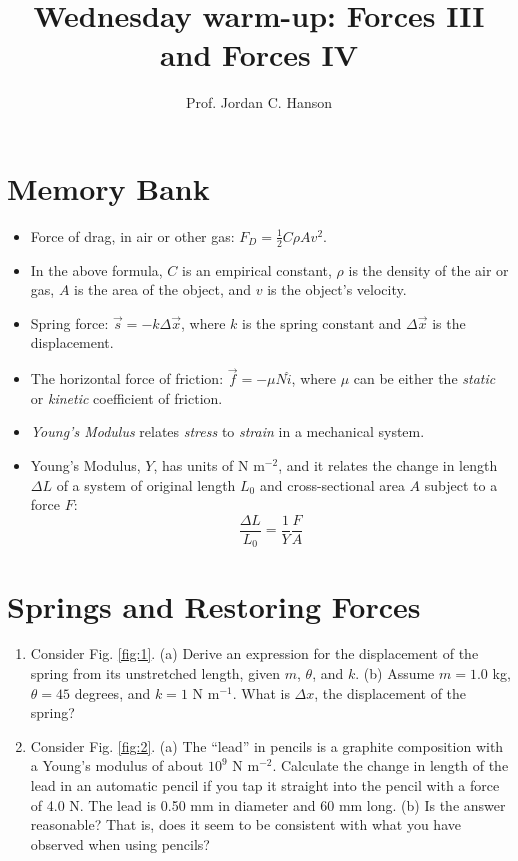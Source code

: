 \documentclass{article}
\begin{document}
\twocolumn

\title{Wednesday warm-up: Forces III and Forces IV}
\author{Prof. Jordan C. Hanson}

\maketitle

\section{Memory Bank}

\begin{itemize}
\item Force of drag, in air or other gas: $F_D = \frac{1}{2}C \rho A v^2$.
\item In the above formula, $C$ is an empirical constant, $\rho$ is the density of the air or gas, $A$ is the area of the object, and $v$ is the object's velocity.
\item Spring force: $\vec{s} = -k \Delta \vec{x}$, where $k$ is the spring constant and $\Delta\vec{x}$ is the displacement.
\item The horizontal force of friction: $\vec{f} = -\mu N \hat{i}$, where $\mu$ can be either the \textit{static} or \textit{kinetic} coefficient of friction.
\item \textit{Young's Modulus} relates \textit{stress} to \textit{strain} in a mechanical system.
\item Young's Modulus, $Y$, has units of N m$^{-2}$, and it relates the change in length $\Delta L$ of a system of original length $L_0$ and cross-sectional area $A$ subject to a force $F$:
\begin{equation}
\frac{\Delta L}{L_0} = \frac{1}{Y} \frac{F}{A}
\end{equation}
\end{itemize}

\section{Springs and Restoring Forces}

\begin{enumerate}
\item Consider Fig. \ref{fig:1}.  (a) Derive an expression for the displacement of the spring from its unstretched length, given $m$, $\theta$, and $k$. (b) Assume $m = 1.0$ kg, $\theta = 45$ degrees, and $k = 1$ N m$^{-1}$.  What is $\Delta x$, the displacement of the spring? \\ \vspace{2.5cm}
\item Consider Fig. \ref{fig:2}. (a) The ``lead'' in pencils is a graphite composition with a Young’s modulus of about $10^9$ N m$^{-2}$. Calculate the change in length of the lead in an automatic pencil if you tap it straight into the pencil with a force of 4.0 N. The lead is 0.50 mm in diameter and 60 mm long. (b) Is the answer reasonable? That is, does it seem to be consistent with what you have observed when using pencils?  \\ \vspace{2.5cm}
\end{enumerate}
\end{document}
